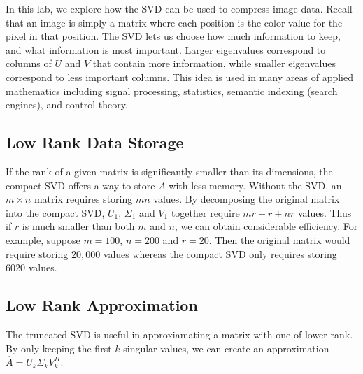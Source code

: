 In this lab, we explore how the SVD can be used to compress image data.
Recall that an image is simply a matrix where each position is the color value for the pixel in that position.
The SVD lets us choose how much information to keep, and what information is most important.
Larger eigenvalues correspond to columns of $U$ and $V$ that contain more information, while smaller eigenvalues correspond to less important columns.
This idea is used in many areas of applied mathematics including signal processing, statistics, semantic indexing (search engines), and control theory.


\subsection*{Low Rank Data Storage}
If the rank of a given matrix is significantly smaller than its dimensions, the compact SVD offers a way to store $A$ with less memory.
Without the SVD, an $m\times n$ matrix requires storing $mn$ values.
By decomposing the original matrix into the compact SVD, $U_1$, $\Sigma_1$ and $V_1$ together require $mr+r+nr$ values.
Thus if $r$ is much smaller than both $m$ and $n$, we can obtain considerable efficiency.
For example, suppose $m=100$, $n=200$ and $r=20$.
Then the original matrix would require storing $20,000$ values whereas the compact SVD only requires storing $6020$ values.

\subsection*{Low Rank Approximation}
The truncated SVD is useful in approxiamating a matrix with one of lower rank.
By only keeping the first $k$ singular values, we can create an approximation $\widehat A = U_k\Sigma_k V_k^H$.

